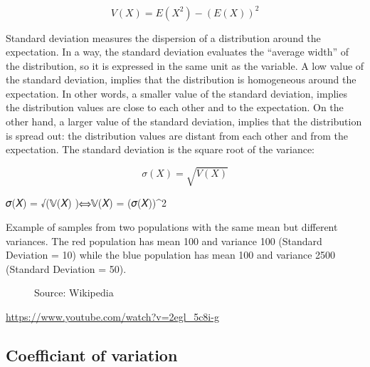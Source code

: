 \documentclass[
  letterpaper,
  DIV=11,
  numbers=noendperiod]{scrreprt}
\begin{document}
\[V(X) = E(X^2) - (E(X))^2\]

Standard deviation measures the dispersion of a distribution around the
expectation. In a way, the standard deviation evaluates the ``average
width'' of the distribution, so it is expressed in the same unit as the
variable. A low value of the standard deviation, implies that the
distribution is homogeneous around the expectation. In other words, a
smaller value of the standard deviation, implies the distribution values
are close to each other and to the expectation. On the other hand, a
larger value of the standard deviation, implies that the distribution is
spread out: the distribution values are distant from each other and from
the expectation. The standard deviation is the square root of the
variance:

\[\sigma(X) = \sqrt{V(X)}\]

𝜎(𝑋) = √(𝕍(𝑋) )⟺𝕍(𝑋) = (𝜎(𝑋))\^{}2

\begin{tcolorbox}[enhanced jigsaw, colframe=quarto-callout-tip-color-frame, opacityback=0, toprule=.15mm, left=2mm, bottomrule=.15mm, opacitybacktitle=0.6, coltitle=black, colbacktitle=quarto-callout-tip-color!10!white, arc=.35mm, bottomtitle=1mm, title=\textcolor{quarto-callout-tip-color}{\faLightbulb}\hspace{0.5em}{Example}, toptitle=1mm, leftrule=.75mm, breakable, titlerule=0mm, rightrule=.15mm, colback=white]

Example of samples from two populations with the same mean but different
variances. The red population has mean 100 and variance 100 (Standard
Deviation = 10) while the blue population has mean 100 and variance 2500
(Standard Deviation = 50).

\end{tcolorbox}

\begin{figure}[H]

{\centering 

}

\caption{Source: Wikipedia}

\end{figure}%

\url{https://www.youtube.com/watch?v=2egl_5c8i-g}

\subsection{Coefficiant of variation}\label{coefficiant-of-variation}
\end{document}
